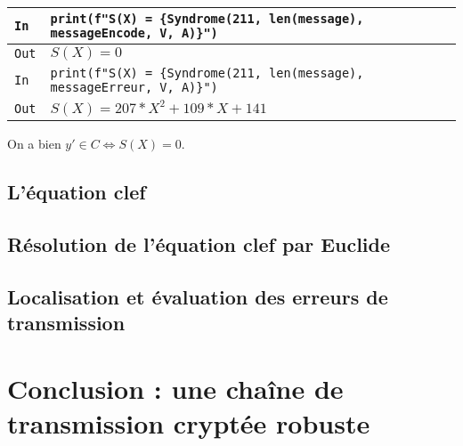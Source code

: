 \documentclass[titlepage]{article}
\begin{document}
        \begin{tabularx}{12cm}{|p{0.60cm}|X|}
            \hline
            \rowcolor{gray}
            \texttt{In}
            & 
            \texttt{print(f"S(X) = \{Syndrome(211, len(message), \newline
            messageEncode, V, A)\}")}
            \\
            \hline
            \texttt{Out}
            &
            \texttt{$S(X) = 0$}
            \\
            \hline
            \rowcolor{gray}
            \texttt{In}
            & 
            \texttt{print(f"S(X) = \{Syndrome(211, len(message), \newline
            messageErreur, V, A)\}")}
            \\
            \hline
            \texttt{Out}
            &
            \texttt{$S(X) = 207*X^2 + 109*X + 141$}
            \\
            \hline
        \end{tabularx}
        \bigbreak

        On a bien $y' \in C \Longleftrightarrow S(X) = 0$.

        \subsection{L’équation clef}
        \subsection{Résolution de l’équation clef par Euclide}

        
        \subsection{Localisation et évaluation des erreurs de transmission}
    \section{Conclusion : une chaîne de transmission cryptée robuste}
\end{document}

